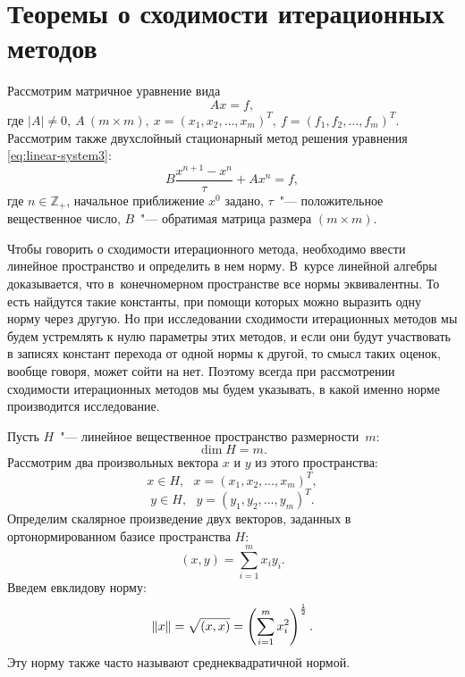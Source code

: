 \documentclass[11pt,a4paper,twoside]{report}
\numberwithin{equation}{section}
\theoremstyle{definition}
\theoremstyle{plain}
\DeclarePairedDelimiter\norm{\lVert}{\rVert}
\begin{document}
\section{Теоремы о сходимости итерационных методов}
%
Рассмотрим матричное уравнение вида
%
\begin{equation}
    \label{eq:linear-system3}
    Ax = f,
\end{equation}
%
где
$
|A| \ne 0, ~A~(m \times m),~
x = (x_1, x_2, \ldots, x_m)^T,~
f = (f_1, f_2, \ldots, f_m)^T
$.
\\
Рассмотрим также двухслойный стационарный метод решения уравнения
\eqref{eq:linear-system3}:
%
\begin{equation}
    \label{eq:iter-process}
    B\frac{x^{n+1} - x^n}{\tau} + Ax^n = f,
\end{equation}
%
где $n \in \mathbb{Z}_+$, начальное приближение $x^0$ задано,
$\tau$~"--- положительное вещественное число, $B$~"--- обратимая матрица размера
$(m \times m)$.

Чтобы говорить о сходимости итерационного метода, необходимо
ввести линейное пространство и определить в нем норму. В~курсе линейной алгебры
доказывается, что в~конечномерном
пространстве все нормы эквивалентны. То есть найдутся такие константы,
при помощи которых можно выразить одну норму через другую. Но при
исследовании сходимости итерационных методов мы будем устремлять
к нулю параметры этих методов, и если они будут участвовать
в записях констант перехода от одной нормы к другой, то смысл таких
оценок, вообще говоря, может сойти на нет. Поэтому всегда при
рассмотрении сходимости итерационных методов мы будем указывать,
в какой именно норме производится исследование.

Пусть $H$~"--- линейное вещественное пространство размерности~$m$:
%
$$
    \dim H = m.
$$
%
Рассмотрим два произвольных вектора $x$ и $y$ из этого пространства:
%
$$
    x \in H, ~~~x = (x_1, x_2, \ldots, x_m)^T,
$$
%
%
$$
    y \in H, ~~~y = (y_1, y_2, \ldots, y_m)^T.
$$
%
Определим скалярное произведение двух векторов, заданных в ортонормированном
базисе пространства $H$:
$$
    (x,y) = \sum\limits_{i=1}^{m} x_iy_i.
$$
%
Введем евклидову норму:
%
$$
    \norm{x} = \sqrt{(x,x)} =
        \left(\sum\limits_{i=1}^{m} x_i^2\right)^{\frac{1}{2}}.
$$
%
Эту норму также часто называют среднеквадратичной нормой.
\end{document}
